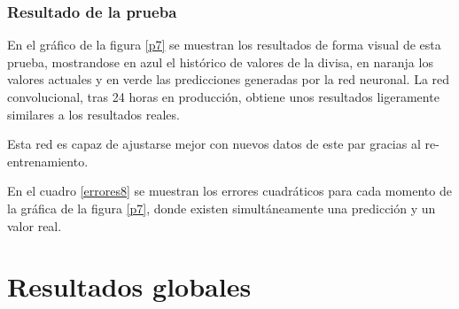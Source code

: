 \subsubsection*{Resultado de la prueba}

En el gráfico de la figura \ref{p7} se muestran los resultados de forma visual de esta prueba, mostrandose en azul el histórico de valores de la divisa, en naranja los valores actuales y en verde las predicciones generadas por la red neuronal. La red convolucional, tras 24 horas en producción, obtiene unos resultados ligeramente similares a los resultados reales. 

Esta red es capaz de ajustarse mejor con nuevos datos de este par gracias al re-entrenamiento.

En el cuadro  \ref{errores8} se muestran los errores cuadráticos para cada momento de la gráfica de la figura \ref{p7}, donde existen simultáneamente una predicción y un valor real.



\clearpage



\section{Resultados globales}\label{sec:concl_pruebas}


